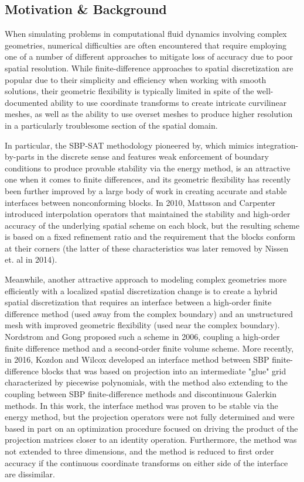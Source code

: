 \subsection{Motivation \& Background}

When simulating problems in computational fluid dynamics involving complex
geometries, numerical difficulties are often encountered that require
employing one of a number of different approaches to mitigate loss of accuracy
due to poor spatial resolution. While finite-difference approaches to spatial
discretization are popular due to their simplicity and efficiency when working
with smooth solutions, their geometric flexibility is typically limited in spite
of the well-documented ability to use coordinate transforms to create intricate
curvilinear meshes, as well as the ability to use overset meshes to produce
higher resolution in a particularly troublesome section of the spatial domain.

In particular, the SBP-SAT methodology pioneered by, which mimics
integration-by-parts in the discrete sense and features weak enforcement of
boundary conditions to produce provable stability via the energy method,
is an attractive one when it comes to finite differences, and its geometric
flexibility has recently been further improved by a large body of work in creating
accurate and stable interfaces between nonconforming blocks. In 2010, Mattsson and
Carpenter introduced interpolation operators that maintained the stability and
high-order accuracy of the underlying spatial scheme on each block, but the
resulting scheme is based on a fixed refinement ratio and the requirement that
the blocks conform at their corners (the latter of these characteristics was
later removed by Nissen et. al in 2014).

Meanwhile, another attractive approach to modeling complex geometries more efficiently
with a localized spatial discretization change is to create a hybrid spatial
discretization that requires an interface between a high-order finite difference
method (used away from the complex boundary) and an unstructured mesh with
improved geometric flexibility (used near the complex boundary). Nordstrom and Gong
proposed such a scheme in 2006, coupling a high-order finite difference method
and a second-order finite volume scheme. More recently, in 2016, Kozdon and Wilcox
developed an interface method between SBP finite-difference blocks that was based
on projection into an intermediate "glue" grid characterized by piecewise polynomials,
with the method also extending to the coupling between SBP finite-difference methods
and discontinuous Galerkin methods. In this work, the interface method was proven
to be stable via the energy method, but the projection operators were not fully
determined and were based in part on an optimization procedure focused on driving
the product of the projection matrices closer to an identity operation. Furthermore,
the method was not extended to three dimensions, and the method is reduced to
first order accuracy if the continuous coordinate transforms on either side
of the interface are dissimilar.

